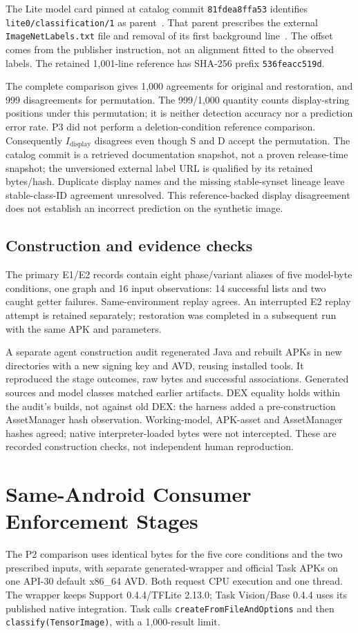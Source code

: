 \documentclass[10pt,conference]{IEEEtran}
\newcommand{\code}[1]{\texttt{#1}}
\begin{document}
The Lite model card pinned at catalog commit \code{81fdea8ffa53} identifies \code{lite0/classification/1} as parent~\cite{tfhub-lite-card}. That parent prescribes the external \code{ImageNetLabels.txt} file and removal of its first background line~\cite{tfhub-parent-card,imagenet-display}. The offset comes from the publisher instruction, not an alignment fitted to the observed labels. The retained 1,001-line reference has SHA-256 prefix \code{536feacc519d}.

The complete comparison gives 1,000 agreements for original and restoration, and 999 disagreements for permutation. The 999/1,000 quantity counts display-string positions under this permutation; it is neither detection accuracy nor a prediction error rate. P3 did not perform a deletion-condition reference comparison. Consequently $I_{\mathrm{display}}$ disagrees even though S and D accept the permutation. The catalog commit is a retrieved documentation snapshot, not a proven release-time snapshot; the unversioned external label URL is qualified by its retained bytes/hash. Duplicate display names and the missing stable-synset lineage leave stable-class-ID agreement unresolved. This reference-backed display disagreement does not establish an incorrect prediction on the synthetic image.

\subsection{Construction and evidence checks}
The primary E1/E2 records contain eight phase/variant aliases of five model-byte conditions, one graph and 16 input observations: 14 successful lists and two caught getter failures. Same-environment replay agrees. An interrupted E2 replay attempt is retained separately; restoration was completed in a subsequent run with the same APK and parameters.

A separate agent construction audit regenerated Java and rebuilt APKs in new directories with a new signing key and AVD, reusing installed tools. It reproduced the stage outcomes, raw bytes and successful associations. Generated sources and model classes matched earlier artifacts. DEX equality holds within the audit's builds, not against old DEX: the harness added a pre-construction AssetManager hash observation. Working-model, APK-asset and AssetManager hashes agreed; native interpreter-loaded bytes were not intercepted. These are recorded construction checks, not independent human reproduction.

\section{Same-Android Consumer Enforcement Stages}
\label{sec:consumers}
The P2 comparison uses identical bytes for the five core conditions and the two prescribed inputs, with separate generated-wrapper and official Task APKs on one API-30 default x86\_64 AVD. Both request CPU execution and one thread. The wrapper keeps Support 0.4.4/TFLite 2.13.0; Task Vision/Base 0.4.4 uses its published native integration. Task calls \code{createFromFileAndOptions} and then \code{classify(TensorImage)}, with a 1,000-result limit.
\end{document}
